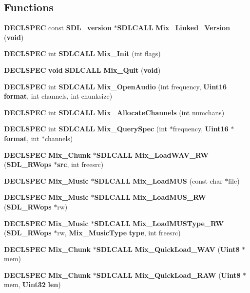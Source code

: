 \subsection*{Functions}
\begin{DoxyCompactItemize}
\item 
{\bf D\+E\+C\+L\+S\+P\+E\+C} const {\bf S\+D\+L\+\_\+version} $\ast${\bf S\+D\+L\+C\+A\+L\+L} {\bf Mix\+\_\+\+Linked\+\_\+\+Version} ({\bf void})
\item 
{\bf D\+E\+C\+L\+S\+P\+E\+C} int {\bf S\+D\+L\+C\+A\+L\+L} {\bf Mix\+\_\+\+Init} (int flags)
\item 
{\bf D\+E\+C\+L\+S\+P\+E\+C} {\bf void} {\bf S\+D\+L\+C\+A\+L\+L} {\bf Mix\+\_\+\+Quit} ({\bf void})
\item 
{\bf D\+E\+C\+L\+S\+P\+E\+C} int {\bf S\+D\+L\+C\+A\+L\+L} {\bf Mix\+\_\+\+Open\+Audio} (int frequency, {\bf Uint16} {\bf format}, int channels, int chunksize)
\item 
{\bf D\+E\+C\+L\+S\+P\+E\+C} int {\bf S\+D\+L\+C\+A\+L\+L} {\bf Mix\+\_\+\+Allocate\+Channels} (int numchans)
\item 
{\bf D\+E\+C\+L\+S\+P\+E\+C} int {\bf S\+D\+L\+C\+A\+L\+L} {\bf Mix\+\_\+\+Query\+Spec} (int $\ast$frequency, {\bf Uint16} $\ast${\bf format}, int $\ast$channels)
\item 
{\bf D\+E\+C\+L\+S\+P\+E\+C} {\bf Mix\+\_\+\+Chunk} $\ast${\bf S\+D\+L\+C\+A\+L\+L} {\bf Mix\+\_\+\+Load\+W\+A\+V\+\_\+\+R\+W} ({\bf S\+D\+L\+\_\+\+R\+Wops} $\ast${\bf src}, int freesrc)
\item 
{\bf D\+E\+C\+L\+S\+P\+E\+C} {\bf Mix\+\_\+\+Music} $\ast${\bf S\+D\+L\+C\+A\+L\+L} {\bf Mix\+\_\+\+Load\+M\+U\+S} (const char $\ast$file)
\item 
{\bf D\+E\+C\+L\+S\+P\+E\+C} {\bf Mix\+\_\+\+Music} $\ast${\bf S\+D\+L\+C\+A\+L\+L} {\bf Mix\+\_\+\+Load\+M\+U\+S\+\_\+\+R\+W} ({\bf S\+D\+L\+\_\+\+R\+Wops} $\ast$rw)
\item 
{\bf D\+E\+C\+L\+S\+P\+E\+C} {\bf Mix\+\_\+\+Music} $\ast${\bf S\+D\+L\+C\+A\+L\+L} {\bf Mix\+\_\+\+Load\+M\+U\+S\+Type\+\_\+\+R\+W} ({\bf S\+D\+L\+\_\+\+R\+Wops} $\ast$rw, {\bf Mix\+\_\+\+Music\+Type} {\bf type}, int freesrc)
\item 
{\bf D\+E\+C\+L\+S\+P\+E\+C} {\bf Mix\+\_\+\+Chunk} $\ast${\bf S\+D\+L\+C\+A\+L\+L} {\bf Mix\+\_\+\+Quick\+Load\+\_\+\+W\+A\+V} ({\bf Uint8} $\ast$mem)
\item 
{\bf D\+E\+C\+L\+S\+P\+E\+C} {\bf Mix\+\_\+\+Chunk} $\ast${\bf S\+D\+L\+C\+A\+L\+L} {\bf Mix\+\_\+\+Quick\+Load\+\_\+\+R\+A\+W} ({\bf Uint8} $\ast$mem, {\bf Uint32} {\bf len})

\end{DoxyCompactItemize}

